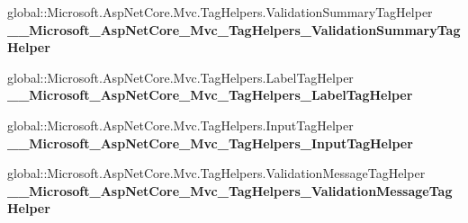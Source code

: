 \begin{DoxyCompactItemize}
\item 
\mbox{\label{class_asp_net_core_1_1_views___volunteers___create_aebd0965a733f309f551ca6ec7e018f7a}} 
global\+::\+Microsoft.\+Asp\+Net\+Core.\+Mvc.\+Tag\+Helpers.\+Validation\+Summary\+Tag\+Helper {\bfseries \+\_\+\+\_\+\+Microsoft\+\_\+\+Asp\+Net\+Core\+\_\+\+Mvc\+\_\+\+Tag\+Helpers\+\_\+\+Validation\+Summary\+Tag\+Helper}
\item 
\mbox{\label{class_asp_net_core_1_1_views___volunteers___create_af3d9c6eddf576065d464f8b5a9e1c0ae}} 
global\+::\+Microsoft.\+Asp\+Net\+Core.\+Mvc.\+Tag\+Helpers.\+Label\+Tag\+Helper {\bfseries \+\_\+\+\_\+\+Microsoft\+\_\+\+Asp\+Net\+Core\+\_\+\+Mvc\+\_\+\+Tag\+Helpers\+\_\+\+Label\+Tag\+Helper}
\item 
\mbox{\label{class_asp_net_core_1_1_views___volunteers___create_a62a15e1dc1d5fec25daabe33558ce9c8}} 
global\+::\+Microsoft.\+Asp\+Net\+Core.\+Mvc.\+Tag\+Helpers.\+Input\+Tag\+Helper {\bfseries \+\_\+\+\_\+\+Microsoft\+\_\+\+Asp\+Net\+Core\+\_\+\+Mvc\+\_\+\+Tag\+Helpers\+\_\+\+Input\+Tag\+Helper}
\item 
\mbox{\label{class_asp_net_core_1_1_views___volunteers___create_a866897fce517b835344678c560c0f975}} 
global\+::\+Microsoft.\+Asp\+Net\+Core.\+Mvc.\+Tag\+Helpers.\+Validation\+Message\+Tag\+Helper {\bfseries \+\_\+\+\_\+\+Microsoft\+\_\+\+Asp\+Net\+Core\+\_\+\+Mvc\+\_\+\+Tag\+Helpers\+\_\+\+Validation\+Message\+Tag\+Helper}
\end{DoxyCompactItemize}
